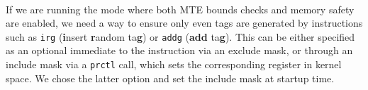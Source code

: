 \paragraph{}
If we are running the mode where both \ac{MTE} bounds checks and memory safety are enabled, we need a way to ensure only even tags are generated by instructions such as \texttt{irg} (\textbf{i}nsert \textbf{r}andom ta\textbf{g}) or \texttt{addg} (\textbf{add} ta\textbf{g}).
This can be either specified as an optional immediate to the instruction via an exclude mask, or through an include mask via a \texttt{prctl} call, which sets the corresponding register in kernel space.
We chose the latter option and set the include mask at startup time.

